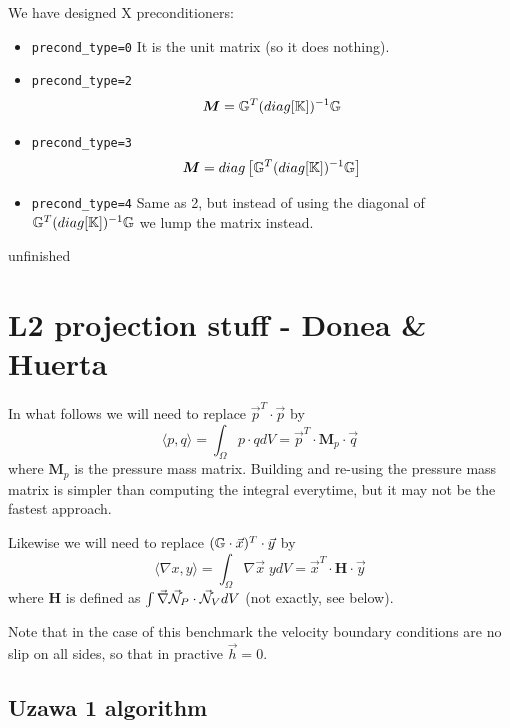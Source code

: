 We have designed X preconditioners:
\begin{itemize}
\item {\tt precond\_type=0} It is the unit matrix (so it does nothing). 

\item {\tt precond\_type=2}
\[
{\bm M} = {\mathbb{G}}^T (diag [{\mathbb{K}}]  )^{-1} {\mathbb{G}} 
\]
\item {\tt precond\_type=3} 
\[
{\bm M} = diag \left[ {\mathbb{G}}^T (diag [{\mathbb{K}}]  )^{-1} {\mathbb{G}} \right]
\]
\item {\tt precond\_type=4} Same as 2, but instead of using the 
diagonal of $ {\mathbb{G}}^T (diag [{\mathbb{K}}]  )^{-1} {\mathbb{G}}$ we lump the matrix instead.

\end{itemize}

{\color{red} \Large unfinished}

\newpage
\section*{L2 projection stuff - Donea \& Huerta}

In what follows we will need to replace $\vec{p}^T\cdot\vec{p}$ 
by 
\[
\langle p,q \rangle = \int_\Omega {p} \cdot {q} dV 
= \vec{p}^T \cdot {\bm M}_{p} \cdot \vec{q}
\]
where ${\bm M}_{p}$ is the pressure mass matrix. 
Building and re-using the pressure mass matrix is simpler than 
computing the integral everytime, but it may not be 
the fastest approach.

Likewise we will need to replace $( {\mathbb{G}} \cdot \vec{x})^T\cdot \vec{y}$
by
\[
\langle \nabla {x},{y} \rangle = \int_\Omega \nabla \vec{x} \; {y} dV = \vec{x}^T \cdot {\bm H} \cdot \vec{y}
\]
where ${\bm H}$ is defined as $\int \vec\nabla \vec{{\mathcal{N}}}_P  \cdot \vec{{\mathcal{N}}}_V dV$ (not exactly, see below). 

Note that in the case of this benchmark the velocity boundary conditions
are no slip on all sides, so that in practive $\vec{h}=0$.

\subsection*{Uzawa 1 algorithm}


